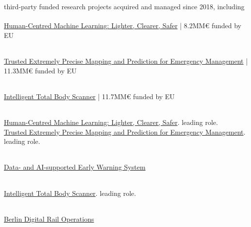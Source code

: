 
\ifdefined{} third-party funded research projects acquired and managed since 2018, including\\
     
        {\\\href{https://www.hhi.fraunhofer.de/en/departments/ai/projects/achilles.html}{
        Human-Centred Machine Learning: Lighter, Clearer, Safer} | 8.2MM€ funded by EU}
        
     {\\\href{https://www.hhi.fraunhofer.de/en/departments/ai/projects/tema.html}{
                        Trusted Extremely Precise Mapping
                    and Prediction for Emergency Management} | 11.3MM€ funded by EU}
                    
    {
        \\\href{https://www.hhi.fraunhofer.de/en/departments/ai/projects/itobos.html}{ Intelligent Total Body Scanner} | 11.7MM€ funded by EU
    }
     
\else
    {
        \\
        \href{https://www.hhi.fraunhofer.de/en/departments/ai/projects/achilles.html}{
        Human-Centred Machine Learning: Lighter, Clearer, Safer}. leading role.
    }
    {
        \\
        \href{https://www.hhi.fraunhofer.de/en/departments/ai/projects/tema.html}{
                        Trusted Extremely Precise Mapping
                    and Prediction for Emergency Management}. leading role.
    }

    {
        \\
        \href{https://www.hhi.fraunhofer.de/en/departments/ai/projects/daki-fws.html}{Data- and AI-supported Early Warning System}
    }

    {
        \\
        \href{https://www.hhi.fraunhofer.de/en/departments/ai/projects/itobos.html}{ Intelligent Total Body Scanner}. leading role.
    }

    {
        \\
        \href{https://www.hhi.fraunhofer.de/en/departments/ai/projects/berdiba.html}{Berlin Digital Rail Operations}
    }

